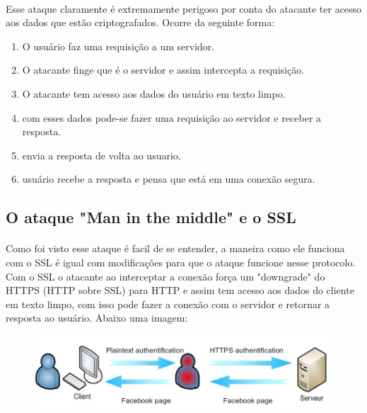 \documentclass{article}
\begin{document}
  \paragraph{}
    Esse ataque claramente é extremamente perigoso por conta do atacante ter
  acesso aos dados que estão criptografados. Ocorre da seguinte forma:

  \begin{enumerate}
    \item O usuário faz uma requisição a um servidor.
    \item O atacante finge que é o servidor e assim intercepta a requisição.
    \item O atacante tem acesso aos dados do usuário em texto limpo.
    \item com esses dados pode-se fazer uma requisição ao servidor e receber
    a resposta.
    \item envia a resposta de volta ao usuario.
    \item usuário recebe a resposta e pensa que está em uma conexão segura.
  \end{enumerate}

  \subsection{O ataque "Man in the middle" e o SSL}
  \paragraph{}
  Como foi visto esse ataque é facil de se entender, a maneira como ele
  funciona com o SSL é igual com modificações para que o ataque funcione nesse
  protocolo. Com o SSL o atacante ao interceptar a conexão força um "downgrade"
  do HTTPS (HTTP sobre SSL) para HTTP e assim tem acesso aos dados do cliente
  em texto limpo, com isso pode fazer a conexão com o servidor e retornar a
  resposta ao usuário. Abaixo uma imagem:

  \begin{figure}[h!]
		\includegraphics[width=\textwidth]{httpsManInTheMiddle.png}
		\label{fig:httpsManInTheMiddle}
	\end{figure}
\end{document}
